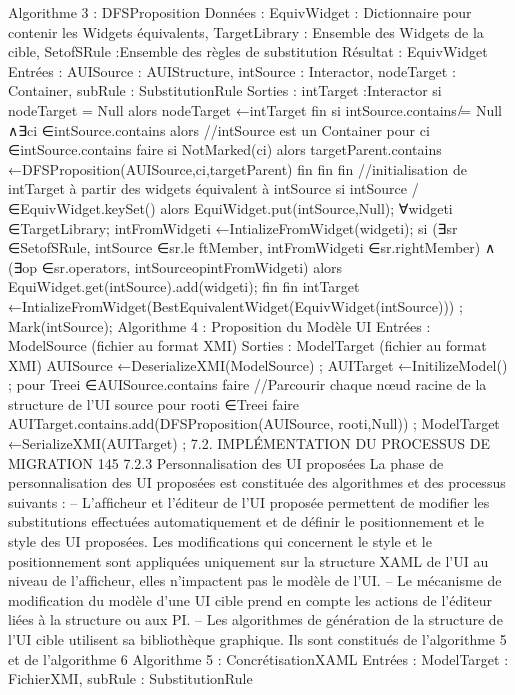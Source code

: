 \documentclass{article}
\begin{document}
Algorithme 3 : DFSProposition
Donn\'{e}es : EquivWidget : Dictionnaire pour contenir les Widgets \'{e}quivalents, TargetLibrary :
Ensemble des Widgets de la cible, SetofSRule :Ensemble des r\`{e}gles de substitution
R\'{e}sultat : EquivWidget
Entr\'{e}es : AUISource : AUIStructure, intSource : Interactor, nodeTarget : Container, subRule :
SubstitutionRule
Sorties : intTarget :Interactor
si nodeTarget = Null alors
nodeTarget ←intTarget
ﬁn
si intSource.contains ̸= Null ∧∃ci ∈intSource.contains alors
//intSource est un Container
pour ci ∈intSource.contains faire
si NotMarked(ci) alors
targetParent.contains ←DFSProposition(AUISource,ci,targetParent)
ﬁn
ﬁn
ﬁn
//initialisation de intTarget \`{a} partir des widgets \'{e}quivalent \`{a} intSource
si intSource /∈EquivWidget.keySet() alors
EquiWidget.put(intSource,Null);
∀widgeti ∈TargetLibrary;
intFromWidgeti ←IntializeFromWidget(widgeti);
si (∃sr ∈SetofSRule, intSource ∈sr.le ftMember, intFromWidgeti ∈sr.rightMember) ∧
(∃op ∈sr.operators, intSourceopintFromWidgeti) alors
EquiWidget.get(intSource).add(widgeti);
ﬁn
ﬁn
intTarget ←IntializeFromWidget(BestEquivalentWidget(EquivWidget(intSource))) ;
Mark(intSource);
Algorithme 4 : Proposition du Mod\`{e}le UI
Entr\'{e}es : ModelSource (ﬁchier au format XMI)
Sorties : ModelTarget (ﬁchier au format XMI)
AUISource ←DeserializeXMI(ModelSource) ;
AUITarget ←InitilizeModel() ;
pour Treei ∈AUISource.contains faire
//Parcourir chaque nœud racine de la structure de l’UI source
pour rooti ∈Treei faire
AUITarget.contains.add(DFSProposition(AUISource, rooti,Null)) ;
ModelTarget ←SerializeXMI(AUITarget) ;
7.2. IMPLÉMENTATION DU PROCESSUS DE MIGRATION
145
7.2.3
Personnalisation des UI propos\'{e}es
La phase de personnalisation des UI propos\'{e}es est constitu\'{e}e des algorithmes et des processus
suivants :
– L’afﬁcheur et l’\'{e}diteur de l’UI propos\'{e}e permettent de modiﬁer les substitutions effectu\'{e}es
automatiquement et de d\'{e}ﬁnir le positionnement et le style des UI propos\'{e}es. Les modiﬁcations
qui concernent le style et le positionnement sont appliqu\'{e}es uniquement sur la structure XAML
de l’UI au niveau de l’afﬁcheur, elles n’impactent pas le mod\`{e}le de l’UI.
– Le m\'{e}canisme de modiﬁcation du mod\`{e}le d’une UI cible prend en compte les actions de l’\'{e}diteur li\'{e}es \`{a} la structure ou aux PI.
– Les algorithmes de g\'{e}n\'{e}ration de la structure de l’UI cible utilisent sa biblioth\`{e}que graphique.
Ils sont constitu\'{e}s de l’algorithme 5 et de l’algorithme 6
Algorithme 5 : Concr\'{e}tisationXAML
Entr\'{e}es : ModelTarget : FichierXMI, subRule : SubstitutionRule
\end{document}
